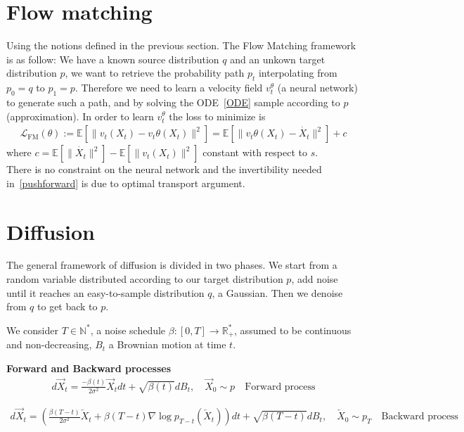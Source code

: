 \documentclass{article}
\begin{document}
\section{Flow matching}

Using the notions defined in the previous section. The Flow Matching framework is as follow: 
We have a known source distribution \(q\) and an unkown target distribution \(p\), we want to retrieve the probability path \(p_t\) interpolating from \(p_0=q\) to \(p_1=p\). Therefore we need to learn a velocity field \(v_t^\theta\) (a neural network) to generate such a path, and by solving the ODE~\ref{ODE} sample according to \(p\) (approximation). In order to learn \(v_t^\theta\) the loss to minimize is 
\begin{align}
    \mathcal{L}_\text{FM}(\theta):=\mathbb{E}[\|v_t(X_t)-v_t\theta(X_t)\|^2]= \mathbb{E}[\|v_t\theta(X_t)-\dot{X_t}\|^2] + c
\end{align} 
where \(c = \mathbb{E}[\|\dot{X_t}\|^2]-\mathbb{E}[\|v_t(X_t)\|^2]\) constant with respect to \(s\). \\
There is no constraint on the neural network and the invertibility needed in~\ref{pushforward} is due to optimal transport argument.

\section{Diffusion}
The general framework of diffusion is divided in two phases. We start from a random variable distributed according to our target distribution \( p \), add noise until it reaches an easy-to-sample distribution \(q\), a Gaussian. Then we denoise from \(q\) to get back to \(p\). 

\bigskip

We consider \(T\in\mathbb{N}^{*}\), a noise schedule \(\beta:[0,T]\rightarrow \mathbb{R}_{+}^{*}\), assumed to be continuous and non-decreasing, \(B_t\) a Brownian motion at time \(t\).

\textbf{Forward and Backward processes}
\begin{align}
    d\overrightarrow{X}_t = \frac{-\beta(t)}{2\sigma^2}\overrightarrow{X}_t dt + \sqrt{\beta(t)}dB_t, \quad \overrightarrow{X}_0\sim p 
    \quad \text{Forward process}
\end{align} 

\begin{align}
    d\overrightarrow{X}_t=\left(  \frac{\beta(T-t)}{2\sigma^2}\overleftarrow{X}_t+\beta(T-t)\nabla\log p_{T-t}\left(\overleftarrow{X}_t \right)  \right)dt + \sqrt{\beta(T-t)}dB_t, \quad \overleftarrow{X}_0\sim p_T \quad \text{Backward process}
\end{align}
\end{document}
